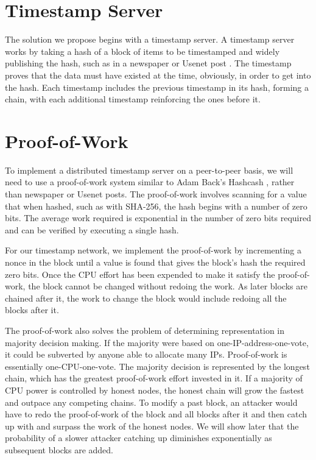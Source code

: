 \documentclass{article}
\begin{document}
\section{Timestamp Server}\label{sec:timestamp-server}
The solution we propose begins with a timestamp server.
A timestamp server works by taking a hash of a block of items to be timestamped and widely publishing the hash, such as in a newspaper or Usenet post \cite{massias1999design, haber1991time, bayer1993improving, haber1997secure}.
The timestamp proves that the data must have existed at the time, obviously, in order to get into the hash.  Each timestamp includes the previous timestamp in its hash, forming a chain, with each additional timestamp reinforcing the ones before it.

\begin{center}
\scalebox{0.75}
{}
\end{center}


\section{Proof-of-Work}\label{sec:proof-of-work}
To implement a distributed timestamp server on a peer-to-peer basis, we will need to use a proof-of-work system similar to Adam Back's Hashcash \cite{back2002hashcash}, rather than newspaper or Usenet posts.
The proof-of-work involves scanning for a value that when hashed, such as with SHA-256, the hash begins with a number of zero bits.
The average work required is exponential in the number of zero bits required and can be verified by executing a single hash.

For our timestamp network, we implement the proof-of-work by incrementing a nonce in the block until a value is found that gives the block's hash the required zero bits.
Once the CPU effort has been expended to make it satisfy the proof-of-work, the block cannot be changed without redoing the work.
As later blocks are chained after it, the work to change the block would include redoing all the blocks after it.

\begin{center}
\scalebox{0.75}
{}
\end{center}

The proof-of-work also solves the problem of determining representation in majority decision making.
If the majority were based on one-IP-address-one-vote, it could be subverted by anyone able to allocate many IPs. Proof-of-work is essentially one-CPU-one-vote.
The majority decision is represented by the longest chain, which has the greatest proof-of-work effort invested in it.
If a majority of CPU power is controlled by honest nodes, the honest chain will grow the fastest and outpace any competing chains.
To modify a past block, an attacker would have to redo the proof-of-work of the block and all blocks after it and then catch up with and surpass the work of the honest nodes.
We will show later that the probability of a slower attacker catching up diminishes exponentially as subsequent blocks are added.
\end{document}
